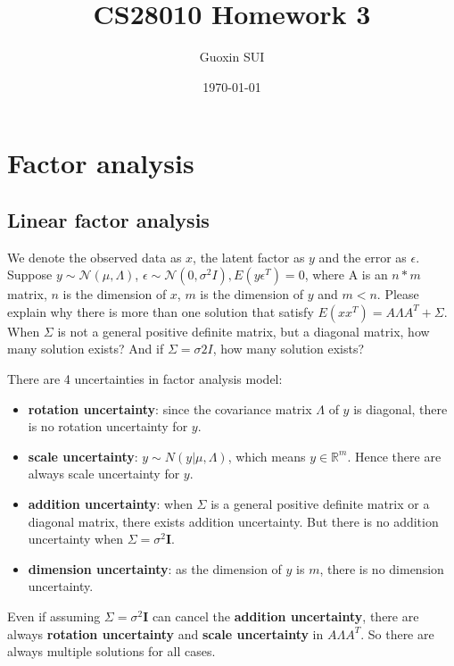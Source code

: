 \documentclass{article}
\title{CS28010 Homework 3}
\author{Guoxin SUI}
\date{\today}
\newenvironment{answer}{\par\color{ForestGreen}}{\par}
\newcommand{\I}{\mathbf{I}}
\begin{document}
\maketitle

\section{Factor analysis}
\subsection{Linear factor analysis}
We denote the observed data as $x$, the latent factor as $y$ and the error as $\epsilon$. Suppose $y \sim \mathcal{N} (\mu, \Lambda)$, $\epsilon \sim \mathcal{N} (0, \sigma^2I), E(y\epsilon^T ) = 0$,
where A is an $n * m$ matrix, $n$ is the dimension of $x$, $m$ is the dimension of $y$ and $m < n$.
Please explain why there is more than one solution that satisfy $E(xx^T ) = A\Lambda A^T + \Sigma$.
When $\Sigma$ is not a general positive definite matrix, but a diagonal matrix, how many solution exists?
And if $\Sigma = \sigma 2I$, how many solution exists?
\begin{answer}
  There are 4 uncertainties in factor analysis model:
  \begin{itemize}
      \item \textbf{rotation uncertainty}: since the covariance matrix $\Lambda$ of $y$ is diagonal, there is no rotation uncertainty for $y$.
      \item \textbf{scale uncertainty}: $y \sim N(y|\mu,\Lambda)$, which means $y\in \mathbb{R}^m$. Hence there are always scale uncertainty for $y$.
      \item \textbf{addition uncertainty}: when $\Sigma$ is a general positive definite matrix or a diagonal matrix, there exists addition uncertainty. But there is no addition uncertainty when $\Sigma = \sigma^2\I$.
      \item \textbf{dimension uncertainty}: as the dimension of $y$ is $m$, there is no dimension uncertainty.
  \end{itemize}
  Even if assuming $\Sigma = \sigma^2\I$ can cancel the \textbf{addition uncertainty}, there are always \textbf{rotation uncertainty} and \textbf{scale uncertainty} in $A\Lambda A^T$. So there are always multiple solutions for all cases.
\end{answer}
\end{document}
